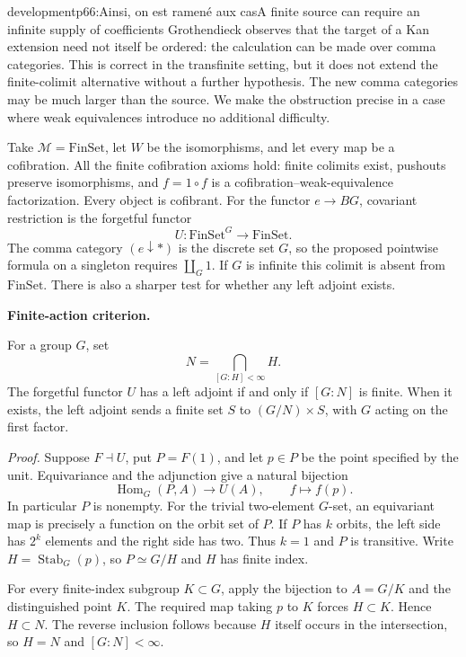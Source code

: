 \begin{dcomment}{development}{p66:Ainsi, on est ramené aux cas}{A finite source can require an infinite supply of coefficients}
Grothendieck observes that the target of a Kan extension need not itself be ordered: the calculation can be made over comma categories. This is correct in the transfinite setting, but it does not extend the finite-colimit alternative without a further hypothesis. The new comma categories may be much larger than the source. We make the obstruction precise in a case where weak equivalences introduce no additional difficulty.

Take $\mathcal M=\mathrm{FinSet}$, let $W$ be the isomorphisms, and let every map be a cofibration. All the finite cofibration axioms hold: finite colimits exist, pushouts preserve isomorphisms, and $f=1\circ f$ is a cofibration--weak-equivalence factorization. Every object is cofibrant. For the functor $e\to BG$, covariant restriction is the forgetful functor
\[
 U:\mathrm{FinSet}^{G}\longrightarrow\mathrm{FinSet}.
\]
The comma category $(e\downarrow *)$ is the discrete set $G$, so the proposed pointwise formula on a singleton requires $\coprod_G1$. If $G$ is infinite this colimit is absent from $\mathrm{FinSet}$. There is also a sharper test for whether any left adjoint exists.

\textbf{Finite-action criterion.}\ours\par
For a group $G$, set
\[
 N=\bigcap_{[G:H]<\infty}H.
\]
The forgetful functor $U$ has a left adjoint if and only if $[G:N]$ is finite. When it exists, the left adjoint sends a finite set $S$ to $(G/N)\times S$, with $G$ acting on the first factor.

\emph{Proof.}
Suppose $F\dashv U$, put $P=F(1)$, and let $p\in P$ be the point specified by the unit. Equivariance and the adjunction give a natural bijection
\[
 \operatorname{Hom}_G(P,A)\longrightarrow U(A),\qquad
 f\longmapsto f(p).
\]
In particular $P$ is nonempty. For the trivial two-element $G$-set, an equivariant map is precisely a function on the orbit set of $P$. If $P$ has $k$ orbits, the left side has $2^k$ elements and the right side has two. Thus $k=1$ and $P$ is transitive. Write $H=\operatorname{Stab}_G(p)$, so $P\simeq G/H$ and $H$ has finite index.

For every finite-index subgroup $K\subset G$, apply the bijection to $A=G/K$ and the distinguished point $K$. The required map taking $p$ to $K$ forces $H\subset K$. Hence $H\subset N$. The reverse inclusion follows because $H$ itself occurs in the intersection, so $H=N$ and $[G:N]<\infty$.


\end{dcomment}
